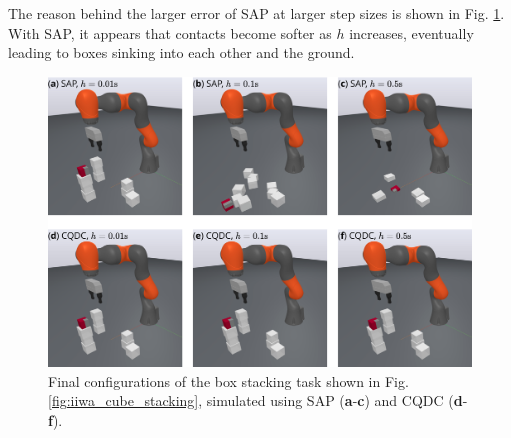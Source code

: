 The reason behind the larger error of SAP at larger step sizes is shown in Fig. \ref{fig:iiwa_cube_stacking_sap_vs_cqdc}. With SAP, it appears that contacts become softer as $h$ increases, eventually leading to boxes sinking into each other and the ground. 
\begin{figure}
\centering
\includegraphics[width=1.0\linewidth]{figures/02_quasi_static_dynamics/sap_vs_cqdc.png}
\caption{Final configurations of the box stacking task shown in Fig. \ref{fig:iiwa_cube_stacking}, simulated using SAP (\textbf{a}-\textbf{c}) and CQDC (\textbf{d}-\textbf{f}).}
\label{fig:iiwa_cube_stacking_sap_vs_cqdc}
\vspace{-0.5cm}
\end{figure}

